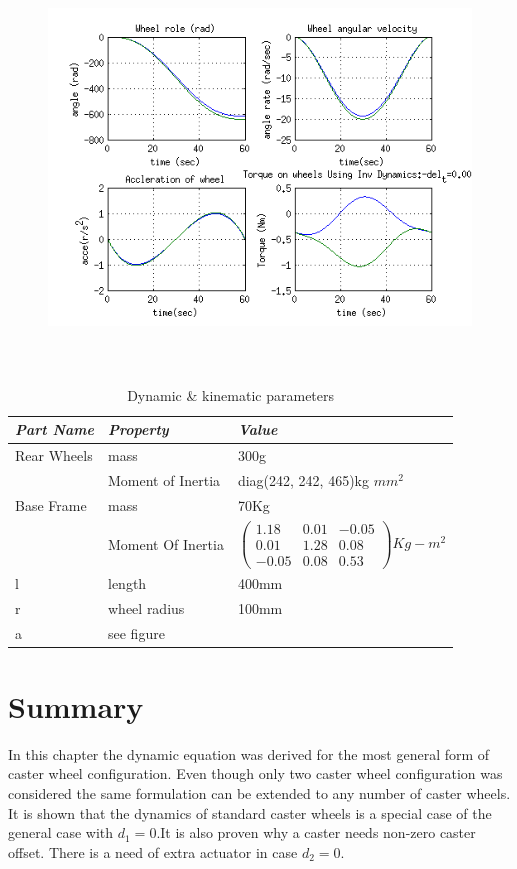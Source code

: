  \begin{figure}
	\includegraphics[height=300pt,keepaspectratio]{Chapter4/fig/FD}
	\label{fig:spiral} 
\end{figure} 
%
\begin{table}[!htbp]
	\caption{Dynamic \& kinematic parameters }
	\label{tb:massproperty}
	\centering
	\begin{tabular}{l l l}
		\hline
		\emph{Part Name}  & \emph{ Property} & \emph{Value} \\
		\hline
		Rear Wheels  & mass &300g \\ 
		 & Moment of Inertia & diag(242, 242, 465)kg $mm^2$\\
		Base Frame & mass & 70Kg \\
		 & Moment Of Inertia & $ \begin{pmatrix}
		 1.18& 0.01&-0.05\\ 0.01 & 1.28 & 0.08\\
		 -0.05 & 0.08 & 0.53
		 \end{pmatrix} Kg-m^2$ \\
		   l & length & 400mm\\
		  r & wheel radius & 100mm\\
		 a & see figure &  \\ 
		\hline
		\end{tabular}
\end{table}
 
\section{Summary}
In this chapter the dynamic equation was derived for  the most general form of caster wheel configuration. Even though  only two caster wheel configuration was considered the same formulation can be extended to any number of caster wheels. It is shown that the  dynamics of standard caster wheels is a special case of the  general case with $d_1=0$.It is also proven why a caster needs  non-zero caster offset. There is a  need of extra actuator in case $d_2=0$.
    




